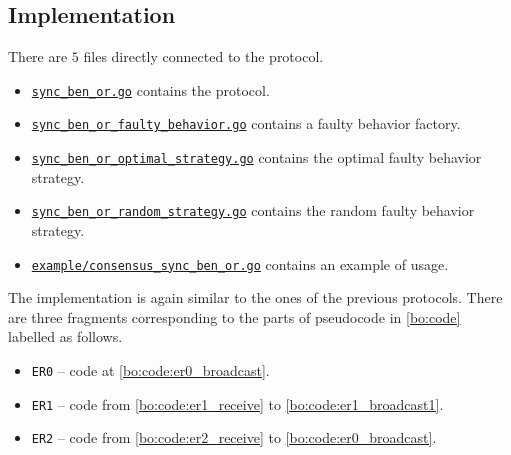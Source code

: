 \subsection{Implementation}
There are $5$ files directly connected to the protocol.
\begin{itemize}
    \item \href{https://github.com/krzysztof-turowski/distributed-framework/blob/6ec7e9cb9a870848f127c539d934b9da9c616ed6/consensus/sync_ben_or/sync_ben_or.go}{\texttt{sync\_ben\_or.go}} contains the protocol.
    \item \href{https://github.com/krzysztof-turowski/distributed-framework/blob/6ec7e9cb9a870848f127c539d934b9da9c616ed6/consensus/sync_ben_or/sync_ben_or_faulty_behavior.go}{\texttt{sync\_ben\_or\_faulty\_behavior.go}} contains a faulty behavior factory.
    \item \href{https://github.com/krzysztof-turowski/distributed-framework/blob/6ec7e9cb9a870848f127c539d934b9da9c616ed6/consensus/sync_ben_or/sync_ben_or_optimal_strategy.go}{\texttt{sync\_ben\_or\_optimal\_strategy.go}} contains the optimal faulty behavior strategy. 
    \item \href{https://github.com/krzysztof-turowski/distributed-framework/blob/6ec7e9cb9a870848f127c539d934b9da9c616ed6/consensus/sync_ben_or/sync_ben_or_random_strategy.go}{\texttt{sync\_ben\_or\_random\_strategy.go}} contains the random faulty behavior strategy.
    \item \href{https://github.com/krzysztof-turowski/distributed-framework/blob/6ec7e9cb9a870848f127c539d934b9da9c616ed6/example/consensus_sync_ben_or.go}{\texttt{example/consensus\_sync\_ben\_or.go}} contains an example of usage.
\end{itemize}
The implementation is again similar to the ones of the previous protocols. There are three fragments corresponding to the parts of pseudocode in \cref{bo:code} labelled as follows.
\begin{itemize}
    \item \texttt{ER0} -- code at \cref{bo:code:er0_broadcast}.
    \item \texttt{ER1} -- code from \cref{bo:code:er1_receive} to \cref{bo:code:er1_broadcast1}.
    \item \texttt{ER2} -- code from \cref{bo:code:er2_receive} to \cref{bo:code:er0_broadcast}.
\end{itemize}
